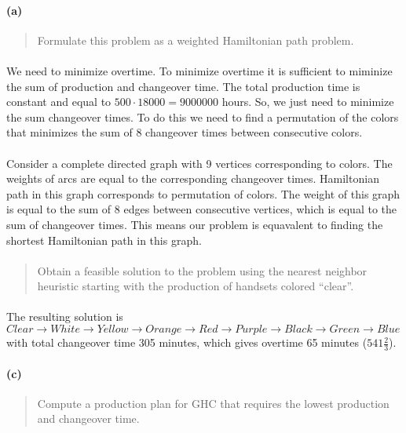 \paragraph{(a)}
\begin{quote}
Formulate this problem as a weighted Hamiltonian path problem.
\end{quote}

\paragraph{}
We need to minimize overtime. To minimize overtime it is sufficient to miminize the sum of production and changeover time. The total production time is constant and equal to $500 \cdot 18000 = 9000000$ hours. So, we just need to minimize the sum changeover times. To do this we need to find a permutation of the colors that minimizes the sum of 8 changeover times between consecutive colors.

\paragraph{}
Consider a complete directed graph with 9 vertices corresponding to colors. The weights of arcs are equal to the corresponding changeover times. Hamiltonian path in this graph corresponds to permutation of colors. The weight of this graph is equal to the sum of 8 edges between consecutive vertices, which is equal to the sum of changeover times. This means our problem is equavalent to finding the shortest Hamiltonian path in this graph.

\paragraph{}
\begin{quote}
Obtain a feasible solution to the problem using the nearest neighbor heuristic
starting with the production of handsets colored “clear”.
\end{quote}

\paragraph{}
The resulting solution is $ Clear \rightarrow White \rightarrow Yellow \rightarrow Orange \rightarrow Red \rightarrow Purple \rightarrow Black \rightarrow Green \rightarrow Blue $ with total changeover time 305 minutes, which gives overtime 65 minutes (\texteuro $541\frac{2}{3}$).

\paragraph{(c)}
\begin{quote}
Compute a production plan for GHC that requires the lowest production and
changeover time.
\end{quote}

